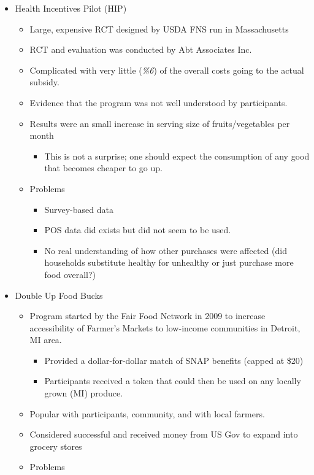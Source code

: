 \documentclass[11pt,letterpaper,]{book}
\providecommand{\tightlist}{%
  \setlength{\itemsep}{0pt}\setlength{\parskip}{0pt}}
\begin{document}
\begin{itemize}
\tightlist
\item
  Health Incentives Pilot (HIP)

  \begin{itemize}
  \tightlist
  \item
    Large, expensive RCT designed by USDA FNS run in Massachusetts
  \item
    RCT and evaluation was conducted by Abt Associates Inc.
  \item
    Complicated with very little (\emph{\%6}) of the overall costs going
    to the actual subsidy.
  \item
    Evidence that the program was not well understood by participants.
  \item
    Results were an small increase in serving size of fruits/vegetables
    per month

    \begin{itemize}
    \tightlist
    \item
      This is not a surprise; one should expect the consumption of any
      good that becomes cheaper to go up.
    \end{itemize}
  \item
    Problems

    \begin{itemize}
    \tightlist
    \item
      Survey-based data
    \item
      POS data did exists but did not seem to be used.
    \item
      No real understanding of how other purchases were affected (did
      households substitute healthy for unhealthy or just purchase more
      food overall?)
    \end{itemize}
  \end{itemize}
\item
  Double Up Food Bucks

  \begin{itemize}
  \tightlist
  \item
    Program started by the Fair Food Network in 2009 to increase
    accessibility of Farmer's Markets to low-income communities in
    Detroit, MI area.

    \begin{itemize}
    \tightlist
    \item
      Provided a dollar-for-dollar match of SNAP benefits (capped at
      \$20)
    \item
      Participants received a token that could then be used on any
      locally grown (MI) produce.
    \end{itemize}
  \item
    Popular with participants, community, and with local farmers.
  \item
    Considered successful and received money from US Gov to expand into
    grocery stores
  \item
    Problems


\end{itemize}
\end{itemize}
\end{document}
